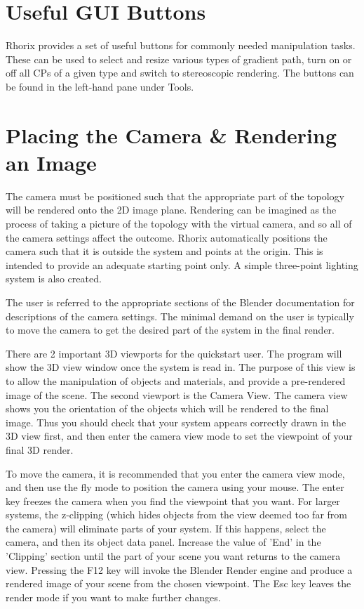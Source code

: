 \documentclass{tufte-handout}
\newcommand{\programName}{Rhorix}
\newcommand{\enterCamera}{keypad $0$}
\newcommand{\flyMode}{Shift-F}
\newcommand{\renderKey}{F12}
\newcommand{\leaveRender}{Esc}
\begin{document}
\section{Useful GUI Buttons}
\programName{} provides a set of useful buttons for commonly needed manipulation tasks. These can be used to select and resize various types of gradient path, turn on or off all CPs of a given type and switch to stereoscopic rendering. The buttons can be found in the left-hand pane under Tools.

\section{Placing the Camera \& Rendering an Image}
The camera must be positioned such that the appropriate part of the topology will be rendered onto the 2D image plane.
Rendering can be imagined as the process of taking a picture of the topology with the virtual camera, and so all of the camera settings affect the outcome. \programName{} automatically positions the camera such that it is outside the system and points at the origin. This is intended to provide an adequate starting point only. A simple three-point lighting system is also created.

The user is referred to the appropriate sections of the Blender documentation for descriptions of the camera settings.
The minimal demand on the user is typically to move the camera to get the desired part of the system in the final 
render.

\par{}
There are 2 important 3D viewports for the quickstart user. The program will show the 3D view window once the 
system is read in.
The purpose of this view is to allow the manipulation of objects and materials, and provide a pre-rendered image 
of the scene.
The second viewport is the Camera View. The camera view shows you the orientation of the objects which will be rendered to the final image.
Thus you should check that your system appears correctly drawn in the 3D view first, and then enter the camera 
view mode to set the viewpoint of your final 3D render.
\par{}
To move the camera, it is recommended that you enter the camera view mode\sidenote{\enterCamera{}}, and then use the fly mode\sidenote{\flyMode{}} to position the camera using your mouse.
The enter key freezes the camera when you find the viewpoint that you want.
For larger systems, the z-clipping (which hides objects from the view deemed too far from the camera) will 
eliminate parts of your system.
If this happens, select the camera, and then its object data panel.
Increase the value of 'End' in the 'Clipping' section until the part of your scene you want returns to the camera view.
Pressing the \renderKey{} key will invoke the Blender Render engine and produce a rendered image of your scene from the chosen viewpoint.
The \leaveRender{} key leaves the render mode if you want to make further changes.
\end{document}

